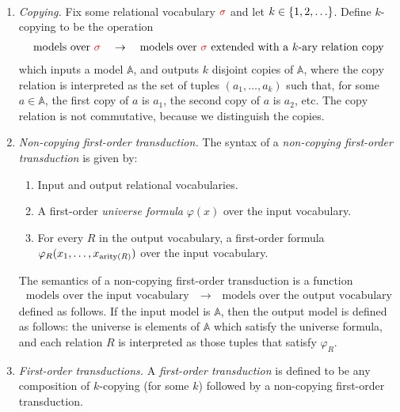 \begin{definition}\label{def:fo-transduction}\ 
\begin{enumerate}
    \item \emph{Copying.} Fix some  relational vocabulary ${\color{red}{\sigma}}$ and let $k \in \{1,2,\ldots\}$. Define $k$-copying to be the operation 
    \begin{align*}
        \text{models over ${\color{red}{\sigma}}$} \quad \to \quad \text{models over ${\color{red}{\sigma}}$ extended with a $k$-ary relation $\mathrm{copy}$}
    \end{align*}
which inputs a model $\mathbb A$, and outputs $k$ disjoint copies of $\mathbb A$, where the  $\mathrm{copy}$ relation is interpreted as the set of tuples $(a_1,\ldots,a_k)$ such that, for  some $a \in \mathbb A$, the first copy of $a$ is  $a_1$, the second copy of $a$ is $a_2$, etc. The $\mathrm{copy}$ relation  is not commutative, because we distinguish the copies.
\item    \emph{Non-copying first-order transduction.} The syntax of a \emph{non-copying first-order transduction}  is given by:
\begin{enumerate}
    \item Input and output relational vocabularies.
    \item A first-order \emph{universe formula} $\varphi(x)$ over the input vocabulary.
    \item For   every $R$ in the output vocabulary, a first-order  formula $\varphi_R(x_1,\ldots,x_{\mathrm{arity}(R)})$ over the input vocabulary.
\end{enumerate}
The semantics of a non-copying first-order transduction is  a function
\begin{align*}
    \text{models over the input vocabulary} \quad \to \quad \text{models over the output vocabulary}
\end{align*}
defined as follows. If the input model is $\mathbb A$, then the output model is defined as follows: the universe is elements of $\mathbb A$ which satisfy the universe formula, and each relation $R$ is interpreted as those tuples that satisfy $\varphi_R$. 
\item \emph{First-order transductions.} A \emph{first-order transduction} is defined to be any  composition of $k$-copying (for some $k$) followed by a non-copying first-order transduction. 
 \end{enumerate}
\end{definition}



